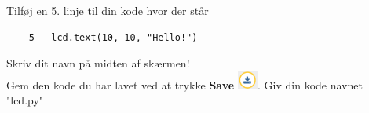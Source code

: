 \documentclass{ucph-handout}
\begin{document}
\begin{exercisebox}[adjusted title=De første skridt]
Tilføj en 5. linje til din kode hvor der står 
\begin{verbatim}
    5   lcd.text(10, 10, "Hello!")
\end{verbatim}

\vspace{3mm}

\vspace{3mm}
Skriv dit navn på midten af skærmen! \\

Gem den kode du har lavet ved at trykke \textbf{Save} \includegraphics[width=0.05\textwidth]{ikoner/save.png}. Giv din kode navnet "lcd.py"
\vspace{3mm}

\end{exercisebox}
\end{document}
